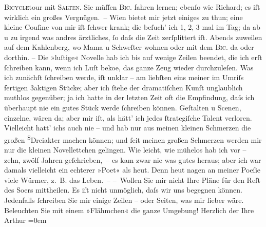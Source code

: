\begin{ledgroupsized}[t]{13cm}
                  \textsc{Bicycle}tour mit \textsc{Salten}. Sie müſſen \textsc{Bic.} fahren lernen; ebenſo wie Richard; es iſt wirklich ein großes
               Vergnügen. –\pend
           \pstart
           Wien bietet mir jetzt einiges zu thun; eine kleine
                  Couſine von mir iſt
               ſchwer krank; die beſuch’ ich 1, 2, 3 mal im Tag; da{\geminationn} ab
               u zu irgend was andres ärztliches, ſo daſs die Zeit zerſplittert iſt.
                  Aben\textcolor{gray}{d}s zuweilen auf dem Kahlenberg, wo Mama u Schweſter
               wohnen oder mit dem \textsc{Bic.} da oder dorthin.\pend
           \pstart
           {\pb}– Die »luſtige« Novelle hab ich bis auf wenige Zeilen beendet, die ich erſt
               ſchreiben kann, wenn ich Luſt beko{\geminationm}e, das ganze Zeug
               wieder durchzuleſen. Was ich zunächſt ſchreiben werde, iſt unklar – am liebſten eins
               meiner im Umriſs fertigen 3aktigen Stücke; aber ich ſtehe der dramatiſchen Kunſt
               unglaublich muthlos gegenüber; ja ich hatte in der letzten Zeit oft die Empfindung,
               daſs ich überhaupt nie {\pb}ein gutes Stück werde ſchreiben
               können. Geſtalten u Scenen, einzelne, wären da; aber mir iſt, als hätt’ ich jedes
               ſtrategiſche Talent verloren. Vielleicht hatt’ ichs auch nie – und hab nur aus meinen
               kleinen Schmerzen die großen \substVorne{}\textsuperscript{S}\substDazwischen{}D\substHinten{}reiakter machen können; und ſeit meinen großen Schmerzen  werden mir nur die kleinen Novellettchen gelingen.
               Wie leicht, wie mühelos hab ich vor – zehn, zwölf Jahren geſchrieben, – {\pb}es kam zwar nie was gutes heraus; aber ich war damals
               vielleicht ein echterer »Poet« als heut. Denn heut nagen an meiner Poeſie viele
               Würmer, z. B. das Leben. –\pend
           \pstart
           – Wollen Sie mir nicht Ihre Pläne für den Reſt des So{\geminationm}ers mittheilen. Es iſt nicht unmöglich, daſs wir uns begegnen können. Jedenfalls
               ſchreiben Sie mir einige Zeilen – oder Seiten, was mir lieber wäre. Beleuchten {\pb}Sie mit einem »Flähmchen« die ganze Umgebung!\pend
           \pstart
           Herzlich der Ihre{\\[\baselineskip]}\spacefill\mbox{Arthur}\pend
           \leftskip=0em{}
         

\end{ledgroupsized}
